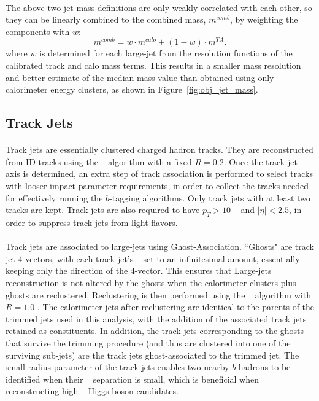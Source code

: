 \paragraph{}
The above two jet mass definitions are only weakly correlated with each other, so they can be linearly combined to the combined mass, $m^{comb}$, by weighting the components with $w$:
\begin{equation}
m^{comb} = w\cdot m^{calo}+(1-w)\cdot m^{TA}.
\end{equation}
where $w$ is determined for each large-\R jet from the resolution functions of the calibrated track and calo mass terms.
This results in a smaller mass resolution and better estimate of the median mass value than obtained using only calorimeter energy clusters, as shown in Figure~\ref{fig:obj_jet_mass}.

\subsection{Track Jets}
\paragraph{}
Track jets are essentially clustered charged hadron tracks. 
They are reconstructed from ID tracks using the \akt~ algorithm with a fixed $R=0.2$. 
Once the track jet axis is determined, an extra step of track association is performed to select tracks with looser impact parameter requirements, in order to collect the tracks needed for effectively running the $b$-tagging algorithms.
Only track jets with at least two tracks are kept.
Track jets are also required to have $p_T > 10$ \GeV~ and $|\eta| < 2.5$, in order to suppress track jets from light flavors.

\paragraph{}
Track jets are associated to large-\R jets using Ghost-Association.
``Ghosts" are track jet 4-vectors, with each track jet's \pt~ set to an infinitesimal amount, essentially keeping only the direction of the 4-vector.
This ensures that Large-\R jets reconstruction is not altered by the ghosts when the calorimeter clusters plus ghosts are reclustered.
Reclustering is then performed using the \akt~ algorithm with $R=1.0$ .
The calorimeter jets after reclustering are identical to the parents of the trimmed jets used in this analysis, with the addition of the associated track jets retained as constituents.
In addition, the track jets corresponding to the ghosts that survive the trimming procedure (and thus are clustered into one of the surviving sub-jets) are the track jets ghost-associated to the trimmed jet.
The small radius parameter of the track-jets enables two nearby $b$-hadrons to be identified when their \DR~ separation is small, which is beneficial when reconstructing high-\pt~ Higgs boson candidates.

